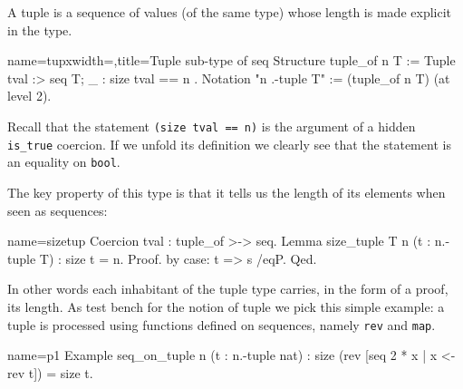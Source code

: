 A tuple is a sequence of values (of the same type) whose length is
made explicit in the type.

\begin{coq}{name=tupx}{width=\textwidth,title=Tuple sub-type of seq}
Structure tuple_of n T :=  Tuple { tval :> seq T; _ : size tval == n }.
Notation "n .-tuple T" := (tuple_of n T) (at level 2).
\end{coq}

Recall that the statement \lstinline/(size tval == n)/
is the argument of a hidden \lstinline/is_true/ coercion.
If we unfold its definition we clearly see that the statement
is an equality on \lstinline/bool/.

%



The key property of this type is that it tells us the length of its
elements when seen as sequences:

\begin{coq}{name=sizetup}{}
Coercion tval : tuple_of >-> seq.
Lemma size_tuple {T n} (t : n.-tuple T) : size t = n.
Proof. by case: t => s /eqP. Qed.
\end{coq}

In other words each inhabitant of the tuple type carries,
in the form of a proof, its length.  As test bench for the notion
of tuple we pick this simple example: a tuple is processed using
functions defined on sequences, namely \lstinline/rev/ and
\lstinline/map/.

\begin{coq}{name=p1}{}
Example seq_on_tuple n (t : n.-tuple nat) :
  size (rev [seq 2 * x | x <- rev t]) = size t.
\end{coq}

